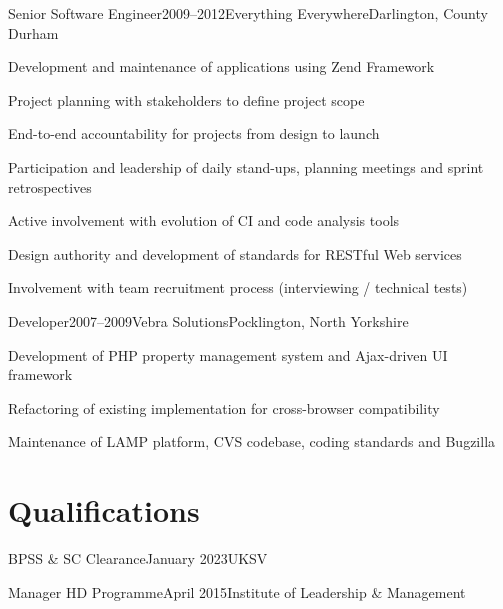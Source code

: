 \documentclass{cv}
\begin{document}
\begin{experience}{Senior Software Engineer}{2009--2012}{Everything Everywhere}{Darlington, County Durham}
\item Development and maintenance of applications using Zend Framework
\item Project planning with stakeholders to define project scope
\item End-to-end accountability for projects from design to launch
\item Participation and leadership of daily stand-ups, planning meetings and sprint retrospectives
\item Active involvement with evolution of CI and code analysis tools
\item Design authority and development of standards for RESTful Web services
\item Involvement with team recruitment process (interviewing / technical tests)
\end{experience}


\begin{experience}{Developer}{2007--2009}{Vebra Solutions}{Pocklington, North Yorkshire}
\item Development of PHP property management system and Ajax-driven UI framework
\item Refactoring of existing implementation for cross-browser compatibility
\item Maintenance of LAMP platform, CVS codebase, coding standards and Bugzilla
\end{experience}


\section{Qualifications}

\begin{experienceplain}{BPSS \& SC Clearance}{January 2023}{UKSV}{}
\end{experienceplain}

\begin{experienceplain}{Manager HD Programme}{April 2015}{Institute of Leadership \& Management}{}
\end{experienceplain}
\end{document}
